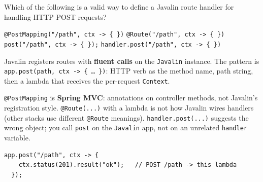 \question[4]
Which of the following is a valid way to define a Javalin route handler for handling HTTP POST requests?
\begin{choices}
  \choice \texttt{@PostMapping("/path", ctx -> \{ \})}
  \choice \texttt{@Route("/path", ctx -> \{ \})}
  \CorrectChoice \texttt{post("/path", ctx -> \{ \});}
  \choice \texttt{handler.post("/path", ctx -> \{ \})}
\end{choices}
\begin{solution}
  Javalin registers routes with \textbf{fluent calls} on the \texttt{Javalin} instance. 
  The pattern is \texttt{app.post(path, ctx -> \{ \ldots\ \})}: HTTP verb as the method name, 
  path string, then a lambda that receives the per-request \texttt{Context}. 

  \texttt{@PostMapping} is \textbf{Spring MVC}: annotations on controller methods, not Javalin's registration style. \texttt{@Route(...)} with a lambda is not how Javalin wires handlers (other stacks use different \texttt{@Route} meanings). \texttt{handler.post(...)} suggests the wrong object; you call \texttt{post} on the \texttt{Javalin} app, not on an unrelated \texttt{handler} variable.

  \begin{lstlisting}[style=javaexam]
  app.post("/path", ctx -> {
    ctx.status(201).result("ok");   // POST /path -> this lambda
  });
  \end{lstlisting}
\end{solution}

\newpage

